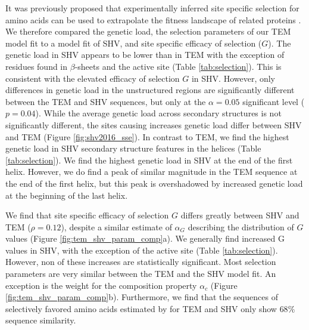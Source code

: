 \documentclass[12pt]{article}
\begin{document}
It was previously proposed that experimentally inferred site specific selection for amino acids can be used to extrapolate the fitness landscape of related proteins \citep{bloom2014, bloom2017}.
We therefore compared the genetic load, the \selac selection parameters of our \selac TEM model fit to a \selac model fit of SHV, and site specific efficacy of selection ($G$).
The genetic load in SHV appears to be lower than in TEM with the exception of residues found in $\beta$-sheets and the active site (Table \ref{tab:selection}).
This is consistent with the elevated efficacy of selection $G$ in SHV.
However, only differences in genetic load in the unstructured regions are significantly different between the TEM and SHV sequences, but only at the $\alpha = 0.05$ significant level ($p = 0.04$).
While the average genetic load across secondary structures is not significantly different, the sites causing increases genetic load differ between SHV and TEM (Figure \ref{fig:shv2016_sse}).
In contrast to TEM, we find the highest genetic load in SHV secondary structure features in the helices (Table \ref{tab:selection}).
We find the highest genetic load in SHV at the end of the first helix.
However, we do find a peak of similar magnitude in the TEM sequence at the end of the first helix, but this peak is overshadowed by increased genetic load at the beginning of the last helix.

We find that site specific efficacy of selection $G$ differs greatly between SHV and TEM ($\rho = 0.12$), despite a similar estimate of $\alpha_G$ describing the distribution of $G$ values (Figure \ref{fig:tem_shv_param_comp}a).
We generally find increased G values in SHV, with the exception of the active site (Table \ref{tab:selection}).
However, non of these increases are statistically significant.
Most \selac selection parameters are very similar between the TEM and the SHV model fit. 
An exception is the weight for the \PC composition property $\alpha_c$ (Figure \ref{fig:tem_shv_param_comp}b).
Furthermore, we find that the sequences of selectively favored amino acids estimated by \selac for TEM and SHV only show $68 \%$ sequence similarity.
\end{document}
